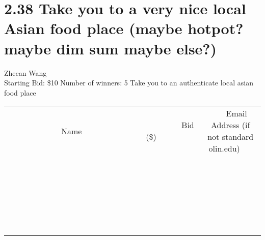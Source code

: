 \documentclass[11pt]{article}
\begin{document}
\section*{2.38 Take you to a very nice local Asian food place (maybe hotpot? maybe dim sum maybe else?)}
Zhecan Wang
\\
Starting Bid: \$10
\newline
Number of winners: 5
\newline
Take you to an authenticate local asian food place
\\[6ex]
\begin{tabular}{c c c}
~~~~~~~~~~~~~Name~~~~~~~~~~~~~ & ~~~~~~~~~Bid (\$)~~~~~~~~~  & ~~~Email Address (if not standard olin.edu)~~~\\
 & & \\
\hline
 & & \\
\hline
 & & \\
\hline
 & & \\
\hline
 & & \\
\hline
 & & \\
\hline
 & & \\
\hline
 & & \\
\hline
 & & \\
\hline
 & & \\
\hline
 & & \\
\hline
 & & \\
\hline
 & & \\
\hline
 & & \\
\hline
 & & \\
\hline
 & & \\
\hline
 & & \\
\hline
 & & \\
\hline
 & & \\
\hline
 & & \\
\hline
 & & \\
\hline
 & & \\
\hline
 & & \\
\hline
 & & \\
\hline
 & & \\
\hline
 & & \\
\hline
\end{tabular}
\newpage
\end{document}
